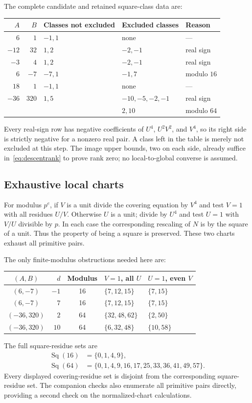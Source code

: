 The complete candidate and retained square-class data are:
\begin{center}\small\setlength{\tabcolsep}{5pt}
\begin{tabular}{rrlll}
\toprule
$A$ &$B$ & Classes not excluded & Excluded classes & Reason\\
\midrule
$6$ &$1$ &$-1,1$ & none & ---\\
$-12$ &$32$ &$1,2$ &$-2,-1$ & real sign\\
$-3$ &$4$ &$1,2$ &$-2,-1$ & real sign\\
$6$ &$-7$ &$-7,1$ &$-1,7$ & modulo $16$\\
$18$ &$1$ &$-1,1$ & none & ---\\
$-36$ &$320$ &$1,5$ &$-10,-5,-2,-1$ & real sign\\
&& &$2,10$ & modulo $64$\\
\bottomrule
\end{tabular}
\end{center}
Every real-sign row has negative coefficients of $U^4$, $U^2V^2$, and $V^4$, so its right side is strictly negative for a nonzero real pair. A class left in the table is merely not excluded at this step. The image upper bounds, two on each side, already suffice in~\eqref{eq:descentrank} to prove rank zero; no local-to-global converse is assumed.

\subsection{Exhaustive local charts}
For modulus $p^e$, if $V$ is a unit divide the covering equation by $V^4$ and test $V=1$ with all residues $U/V$. Otherwise $U$ is a unit; divide by $U^4$ and test $U=1$ with $V/U$ divisible by $p$. In each case the corresponding rescaling of $N$ is by the square of a unit. Thus the property of being a square is preserved. These two charts exhaust all primitive pairs.

The only finite-modulus obstructions needed here are:
\begin{center}\small
\begin{tabular}{crcll}
\toprule
$(A,B)$ & $d$ & Modulus & $V=1$, all $U$ & $U=1$, even $V$\\
\midrule
$(6,-7)$ & $-1$ &16& $\{7,12,15\}$ & $\{7,15\}$\\
$(6,-7)$ & $7$ &16& $\{7,12,15\}$ & $\{7,15\}$\\
$(-36,320)$ & $2$ &64& $\{32,48,62\}$ & $\{2,50\}$\\
$(-36,320)$ & $10$ &64& $\{6,32,48\}$ & $\{10,58\}$\\
\bottomrule
\end{tabular}
\end{center}
The full square-residue sets are
\begin{align*}
 \operatorname{Sq}(16)&=\{0,1,4,9\},\\
 \operatorname{Sq}(64)&=\{0,1,4,9,16,17,25,33,36,41,49,57\}.
\end{align*}
Every displayed covering-residue set is disjoint from the corresponding square-residue set. The companion checks also enumerate all primitive pairs directly, providing a second check on the normalized-chart calculations.

